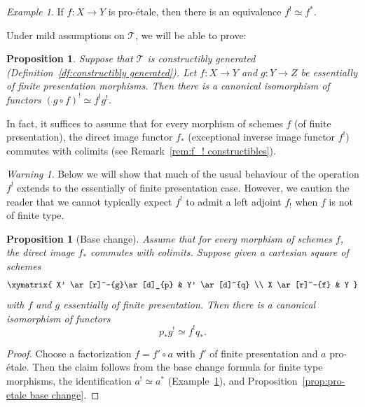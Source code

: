 \documentclass[JEP,XML,SOM,Unicode]{cedram}
\newcommand{\T}{\mathscr T}
\newtheorem{prop}[thm]{Proposition}
\theoremstyle{remark}
\newtheorem{ex}[thm]{Example}
\newtheorem{warn}[thm]{Warning}
\theoremstyle{definition}
\numberwithin{equation}{thm}
\begin{document}
\begin{ex}\label{ex:f^! pro-etale}
If $f : X \to Y$ is pro-étale, then there is an equivalence $f^! \simeq f^*$.
\end{ex}

Under mild assumptions on $\T$, we will be able to prove:

\begin{prop}\label{prop:f^! efp compose}
Suppose that $\T$ is constructibly generated (Definition~\ref{df:constructibly generated}).
Let $f : X \to Y$ and $g : Y \to Z$ be essentially of finite presentation morphisms.
Then there is a canonical isomorphism of functors $(g\circ f)^! \simeq f^!g^!$.
\end{prop}

In fact, it suffices to assume that for every morphism of schemes $f$ (\resp of finite presentation), the direct image functor $f_*$ (\resp exceptional inverse image functor $f^!$) commutes with colimits (see Remark~\ref{rem:f_! constructibles}).

\begin{warn}\label{warn:f_! efp}
Below we will show that much of the usual behaviour of the operation $f^!$ extends to the essentially of finite presentation case.
However, we caution the reader that we cannot typically expect $f^!$ to admit a left adjoint $f_!$ when $f$ is not of finite type.
\end{warn}

\begin{prop}[Base change]\label{prop:base change efp}
Assume that for every morphism of schemes $f$, the direct image $f_*$ commutes with colimits.
Suppose given a cartesian square of schemes
\[
\xymatrix{
X' \ar[r]^-{g}\ar[d]_{p}
& Y' \ar[d]^{q}
\\
X \ar[r]^-{f}
& Y
}
\]
with $f$ and $g$ essentially of finite presentation.
Then there is a canonical isomorphism of functors
\[
p_*g^! \simeq f^!q_*.
\]
\end{prop}
\begin{proof}
Choose a factorization $f = f' \circ a$ with $f'$ of finite presentation and $a$ pro-étale.
Then the claim follows from the base change formula for finite type morphisms, the identification $a^! \simeq a^*$ (Example~\ref{ex:f^! pro-etale}), and Proposition~\ref{prop:pro-etale base change}.
\end{proof}
\end{document}
